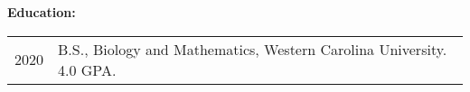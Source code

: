 \textbf{Education:}

\begin{tabular}{cl}
2020 & B.S., Biology and Mathematics, Western Carolina University. 4.0 GPA. \\
\end{tabular}